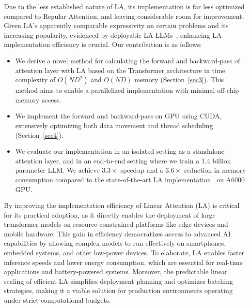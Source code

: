 \par Due to the less established nature of LA, its implementation is far less optimized compared to Regular Attention, and leaving considerable room for improvement. Given LA's apparently comparable expressivity on certain problems and its increasing popularity, evidenced by deployable LA LLMs~\cite{minimax2025minimax01scalingfoundationmodels}, enhancing LA implementation efficiency is crucial. Our contribution is as follows:
\begin{itemize}
    \item We derive a novel method for calculating the forward and backward-pass of attention layer with LA based on the Transformer architecture in time complexity of $O(ND^2)$ and $O(ND)$ memory (Section~\ref{sec3}). This method aims to enable a parallelized implementation with minimal off-chip memory access.
    \item We implement the forward and backward-pass on GPU using CUDA, extensively optimizing both data movement and thread scheduling (Section~\ref{sec4}).
    \item We evaluate our implementation in an isolated setting as a standalone attention layer, and in an end-to-end setting where we train a 1.4 billion parameter LLM. We achieve $3.3\times$ speedup and a $3.6\times$ reduction in memory consumption compared to the state-of-the-art LA implementation~\cite{yang2023gated} on A6000 GPU. 
\end{itemize}

\par By improving the implementation efficiency of Linear Attention (LA) is critical for its practical adoption, as it directly enables the deployment of large transformer models on resource-constrained platforms like edge devices and mobile hardware. This gain in efficiency democratizes access to advanced AI capabilities by allowing complex models to run effectively on smartphones, embedded systems, and other low-power devices. To elaborate, LA enables faster inference speeds and lower energy consumption, which are essential for real-time applications and battery-powered systems. Moreover, the predictable linear scaling of efficient LA simplifies deployment planning and optimizes batching strategies, making it a viable solution for production environments operating under strict computational budgets.


